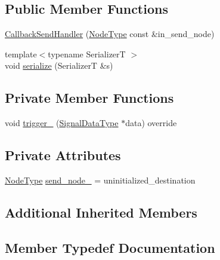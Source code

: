 \subsection*{Public Member Functions}
\begin{DoxyCompactItemize}
\item 
\hyperlink{structvt_1_1pipe_1_1callback_1_1_callback_send_handler_af1f6a9e98ca21793a1c6d0505bf65ed9}{Callback\+Send\+Handler} (\hyperlink{namespacevt_a866da9d0efc19c0a1ce79e9e492f47e2}{Node\+Type} const \&in\+\_\+send\+\_\+node)
\item 
{\footnotesize template$<$typename SerializerT $>$ }\\void \hyperlink{structvt_1_1pipe_1_1callback_1_1_callback_send_handler_ae1229f253b82ad716c9a3b0f0b675684}{serialize} (SerializerT \&s)
\end{DoxyCompactItemize}
\subsection*{Private Member Functions}
\begin{DoxyCompactItemize}
\item 
void \hyperlink{structvt_1_1pipe_1_1callback_1_1_callback_send_handler_a069824f97db580f544c9d9bfd46cb917}{trigger\+\_\+} (\hyperlink{structvt_1_1pipe_1_1callback_1_1_callback_send_handler_abe4218870eea9f91ac7bbffbc58b92fd}{Signal\+Data\+Type} $\ast$data) override
\end{DoxyCompactItemize}
\subsection*{Private Attributes}
\begin{DoxyCompactItemize}
\item 
\hyperlink{namespacevt_a866da9d0efc19c0a1ce79e9e492f47e2}{Node\+Type} \hyperlink{structvt_1_1pipe_1_1callback_1_1_callback_send_handler_a7c075ef051de92654dac6d4b291e60e2}{send\+\_\+node\+\_\+} = uninitialized\+\_\+destination
\end{DoxyCompactItemize}
\subsection*{Additional Inherited Members}


\subsection{Member Typedef Documentation}
\mbox{\label{structvt_1_1pipe_1_1callback_1_1_callback_send_handler_a36b875a40dee2312857aacd407d5f9d3}} 
